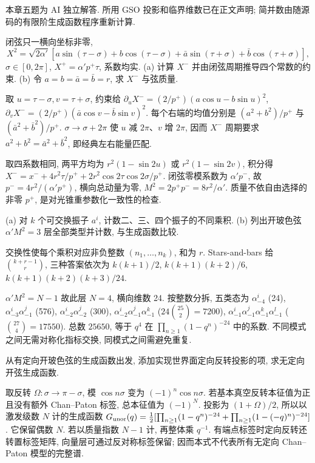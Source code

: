 本章五题为 AI 独立解答. 所用 GSO 投影和临界维数已在正文声明; 简并数由随源码的有限阶生成函数程序重新计算.

\begin{exercise}
闭弦只一横向坐标非零,
\[
X^2=\sqrt{2\alpha'}[a\sin(\tau-\sigma)+b\cos(\tau-\sigma)
+\bar a\sin(\tau+\sigma)+\bar b\cos(\tau+\sigma)],
\]
$\sigma\in[0,2\pi]$, $X^+=\alpha'p^+\tau$, 系数均实.
(a) 计算 $X^-$ 并由闭弦周期推导四个常数的约束.
(b) 令 $a=b=\bar a=\bar b=r$, 求 $X^-$ 与弦质量.
\end{exercise}
\begin{solution}
取 $u=\tau-\sigma,v=\tau+\sigma$, 约束给 $\partial_uX^-=(2/p^+)(a\cos u-b\sin u)^2$, $\partial_vX^-=(2/p^+)(\bar a\cos v-\bar b\sin v)^2$. 每个右端的均值分别是 $(a^2+b^2)/p^+$ 与 $(\bar a^2+\bar b^2)/p^+$. $\sigma\to\sigma+2\pi$ 使 $u$ 减 $2\pi$、$v$ 增 $2\pi$, 因而 $X^-$ 周期要求 $a^2+b^2=\bar a^2+\bar b^2$, 即经典左右能量匹配.

取四系数相同, 两平方均为 $r^2(1-\sin2u)$ 或 $r^2(1-\sin2v)$, 积分得
$X^-=x^-+4r^2\tau/p^++2r^2\cos2\tau\cos2\sigma/p^+$.
闭弦零模系数为 $\alpha'p^-$, 故 $p^-=4r^2/(\alpha'p^+)$, 横向总动量为零, $M^2=2p^+p^-=8r^2/\alpha'$. 质量不依自由选择的非零 $p^+$, 是对光锥重参数化一致性的检查.
\end{solution}

\begin{exercise}
(a) 对 $k$ 个可交换振子 $a^i$, 计数二、三、四个振子的不同乘积.
(b) 列出开玻色弦 $\alpha'M^2=3$ 层全部类型并计数, 与生成函数比较.
\end{exercise}
\begin{solution}
交换性使每个乘积对应非负整数 $(n_1,\ldots,n_k)$, 和为 $r$. Stars-and-bars 给 $\binom{k+r-1}{r}$, 三种答案依次为 $k(k+1)/2$, $k(k+1)(k+2)/6$, $k(k+1)(k+2)(k+3)/24$.

$\alpha'M^2=N-1$ 故此层 $N=4$, 横向维数 24. 按整数分拆, 五类态为 $\alpha_{-4}^i$ (24), $\alpha_{-3}^i\alpha_{-1}^j$ (576), $\alpha_{-2}^i\alpha_{-2}^j$ (300), $\alpha_{-2}^i\alpha_{-1}^j\alpha_{-1}^k$ ($24\binom{25}2=7200$), $\alpha_{-1}^i\alpha_{-1}^j\alpha_{-1}^k\alpha_{-1}^l$ ($\binom{27}4=17550$). 总数 $25650$, 等于 $q^4$ 在 $\prod_{n\ge1}(1-q^n)^{-24}$ 中的系数. 不同模式之间无需对称化指标交换, 同模式之间需避免重复.
\end{solution}

\begin{exercise}
从有定向开玻色弦的生成函数出发, 添加实现世界面定向反转投影的项, 求无定向开弦生成函数.
\end{exercise}
\begin{solution}
取反转 $\Omega:\sigma\to\pi-\sigma$, 模 $\cos n\sigma$ 变为 $(-1)^n\cos n\sigma$. 若基本真空反转本征值为正且没有额外 Chan--Paton 标签, 总本征值为 $(-1)^N$. 投影为 $(1+\Omega)/2$, 所以以激发级数 $N$ 计的生成函数
$G_{\rm unor}(q)=\frac12[\prod_{n\ge1}(1-q^n)^{-24}+\prod_{n\ge1}(1-(-q)^n)^{-24}]$.
它保留偶数 $N$. 若以质量指数 $N-1$ 计, 再整体乘 $q^{-1}$. 有端点标签时定向反转还转置标签矩阵, 向量层可通过反对称标签保留; 因而本式不代表所有无定向 Chan--Paton 模型的完整谱.
\end{solution}

